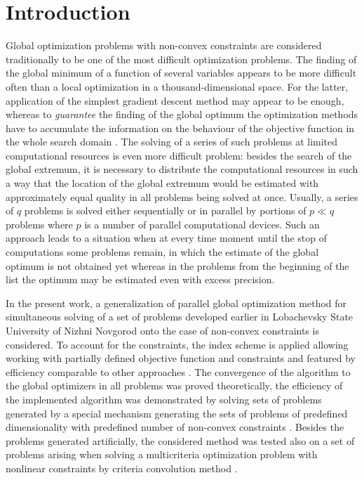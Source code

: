 \documentclass[runningheads]{llncs}
\begin{document}
\section{Introduction}
\label{sec-intro}
Global optimization problems with non-convex constraints are considered traditionally to be one
of the most difficult optimization problems.
 The finding of the global minimum of a function of several variables appears to be more
difficult often than a local optimization in a thousand-dimensional space.
For the latter, application of the simplest gradient descent method may appear to be enough,
whereas to \textit{guarantee} the finding of the global optimum the optimization
methods have to accumulate the information on the behaviour of the objective function in the
whole search domain \cite{Jones2009,Paulavicius2011,Evtushenko2013,Strongin2000}.
The solving of a series of such problems at limited computational resources is even more
difficult problem: besides the search of the global extremum, it is necessary to distribute the
computational resources in such a way that the location of the global extremum would be
estimated with approximately equal quality in all problems being solved at once.
Usually, a series of \(q\) problems is solved either sequentially or in parallel by portions of \(p\ll
q\) problems where \(p\) is a number of parallel computational devices.
Such an approach leads to a situation when at every time moment until the stop of computations
some problems remain, in which the estimate of the global optimum is not obtained yet whereas
in the problems from the beginning of the list the optimum may be estimated even with excess
precision.

In the present work, a generalization of parallel global optimization method for simultaneous
solving of a set of problems developed earlier in Lobachevsky State University of Nizhni Novgorod
\cite{BarkalovStrongin2018} onto the case of non-convex constraints is considered. To account
for the constraints, the index scheme \cite{Strongin2000,Pugliese} is applied allowing working with
partially defined objective function and constraints and featured by efficiency comparable to other
approaches \cite{BarkalovLebedev2017}. The convergence of the algorithm to the global
optimizers in all problems was proved theoretically, the efficiency of the implemented
algorithm was demonstrated by solving sets of problems generated by a special mechanism
generating the sets of problems of predefined dimensionality with predefined number of
non-convex constraints \cite{GergelBarkalov2019}.
Besides the problems generated artificially, the considered method was tested also on a set of
problems arising when solving a multicriteria optimization problem with nonlinear constraints by
criteria convolution method \cite{Ehrgott2005}.
\end{document}

